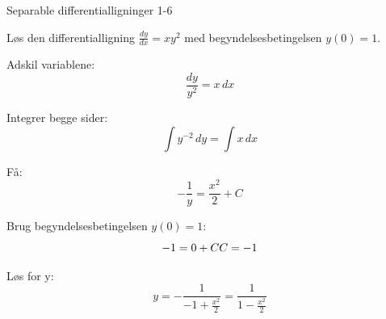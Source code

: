 \documentclass{article}
\begin{document}
\newpage

\begin{exercise}{Separable differentialligninger 1-6}

Løs den differentialligning $\frac{dy}{dx} = xy^2$ med begyndelsesbetingelsen $y(0) = 1$.


\hint

Adskil variablene:
\[
\frac{dy}{y^2} = x \, dx
\]

\hint

Integrer begge sider:
\[
\int y^{-2} \, dy = \int x \, dx
\]

\hint

Få:
\[
-\frac{1}{y} = \frac{x^2}{2} + C
\]

\hint

Brug begyndelsesbetingelsen $y(0) = 1$:
\[
-1 = 0 + C \\ C = -1
\]

\hint

Løs for y:
\[
y = -\frac{1}{-1 + \frac{x^2}{2}} = \frac{1}{1 - \frac{x^2}{2}}
\]

\end{exercise}
\end{document}
